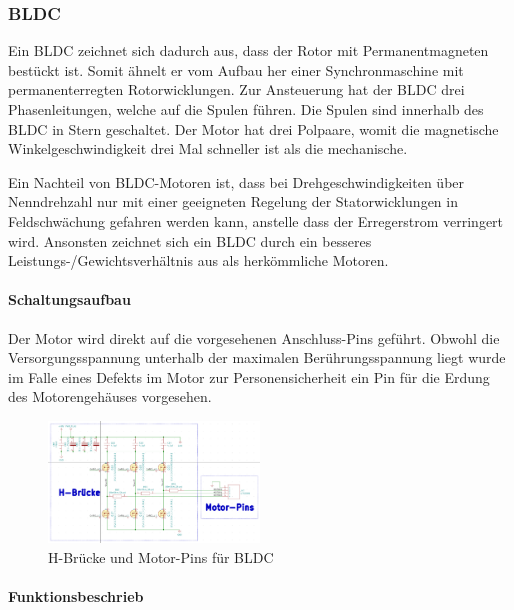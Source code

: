 \newpage
\subsubsection{BLDC}
\label{subsubsec:BLDC}

Ein BLDC zeichnet sich dadurch aus, dass der Rotor mit Permanentmagneten bestückt ist. Somit ähnelt er vom Aufbau her einer Synchronmaschine mit permanenterregten Rotorwicklungen. Zur Ansteuerung hat der BLDC drei Phasenleitungen, welche auf die Spulen führen. Die Spulen sind innerhalb des BLDC in Stern geschaltet. Der Motor hat drei Polpaare, womit die magnetische Winkelgeschwindigkeit drei Mal schneller ist als die mechanische.

Ein Nachteil von BLDC-Motoren ist, dass bei Drehgeschwindigkeiten über Nenndrehzahl nur mit einer geeigneten Regelung der Statorwicklungen in Feldschwächung gefahren werden kann, anstelle dass der Erregerstrom verringert wird. Ansonsten zeichnet sich ein BLDC durch ein besseres Leistungs-/Gewichtsverhältnis aus als herkömmliche Motoren.

\paragraph{Schaltungsaufbau}\mbox{}

Der Motor wird direkt auf die vorgesehenen Anschluss-Pins geführt. Obwohl die Versorgungsspannung unterhalb der maximalen Berührungsspannung liegt wurde im Falle eines Defekts im Motor zur Personensicherheit ein Pin für die Erdung des Motorengehäuses vorgesehen.

\begin{figure}[h!]
	\centering
	\includegraphics[width=0.5\textwidth]{graphics/Schema_H_Bruecke_und_BLDC}
	\caption{H-Brücke und Motor-Pins für BLDC}
	\label{fig:Schema_H_Bruecke_und_BLDC}
\end{figure}

\paragraph{Funktionsbeschrieb}\mbox{}

